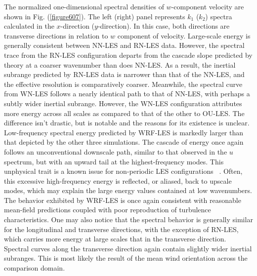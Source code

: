 The normalized one-dimensional spectral densities of $w$-component velocity are shown in Fig. (\autoref{figure607}). The left (right) panel represents $k_1$ ($k_2$) spectra calculated in the $x$-direction ($y$-direction). In this case, both directions are transverse directions in relation to $w$ component of velocity. Large-scale energy is generally consistent between NN-LES and RN-LES data. However, the spectral trace from the RN-LES configuration departs from the cascade slope predicted by theory at a coarser wavenumber than does NN-LES. As a result, the inertial subrange predicted by RN-LES data is narrower than that of the NN-LES, and the effective resolution is comparatively coarser. Meanwhile, the spectral curve from WN-LES follows a nearly identical path to that of NN-LES, with perhaps a subtly wider inertial subrange. However, the WN-LES configuration attributes more energy across all scales as compared to that of the other to OU-LES. The difference isn't drastic, but is notable and the reasons for its existence is unclear. Low-frequency spectral energy predicted by WRF-LES is markedly larger than that depicted by the other three simulations. The cascade of energy once again follows an unconventional downscale path, similar to that observed in the $u$ spectrum, but with an upward tail at the highest-frequency modes. This unphysical trait is a known issue for non-periodic LES configurations ~\citep{Skamarock04}. Often, this excessive high-frequency energy is reflected, or aliased, back to upscale modes, which may explain the large energy values contained at low wavenumbers. The behavior exhibited by WRF-LES is once again consistent with reasonable mean-field predictions coupled with poor reproduction of turbulence characteristics. One may also notice that the spectral behavior is generally similar for the longitudinal and transverse directions, with the exception of RN-LES, which carries more energy at large scales that in the transverse direction. Spectral curves along the transverse direction again contain slightly wider inertial subranges. This is most likely the result of the mean wind orientation across the comparison domain.



